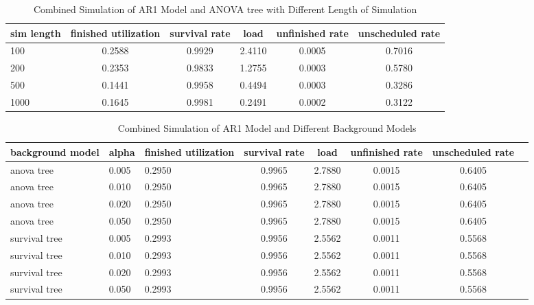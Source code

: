 \documentclass{article}
\begin{document}
\begin{longtable}[htbp]{l|*{5}{c}} 
  \caption{Combined Simulation of AR1 Model and ANOVA tree with Different Length of Simulation}
  \label{tab:tab3.2.2} \\
  \textbf{sim length} & \textbf{finished utilization} & \textbf{survival rate} &
  \textbf{load} & \textbf{unfinished rate} & \textbf{unscheduled rate} \\
  \hline
  100 & 0.2588 & 0.9929 & 2.4110 & 0.0005 & 0.7016\\
  200 & 0.2353 & 0.9833 & 1.2755 & 0.0003 & 0.5780\\
  500 & 0.1441 & 0.9958 & 0.4494 & 0.0003 & 0.3286\\
  1000 & 0.1645 & 0.9981 & 0.2491 & 0.0002 & 0.3122\\
\end{longtable}

\begin{longtable}[htbp]{l|l|l|*{5}{c}} 
  \caption{Combined Simulation of AR1 Model and Different Background Models}
  \label{tab:tab3.2.3}\\
  \textbf{background model} & \textbf{alpha} & \textbf{finished
  utilization} & \textbf{survival rate} & \textbf{load} & \textbf{unfinished
  rate} & \textbf{unscheduled rate} \\
  \hline
  anova tree & 0.005 & 0.2950 & 0.9965 & 2.7880 & 0.0015 & 0.6405\\
  anova tree & 0.010 & 0.2950 & 0.9965 & 2.7880 & 0.0015 & 0.6405\\
  anova tree & 0.020 & 0.2950 & 0.9965 & 2.7880 & 0.0015 & 0.6405\\
  anova tree & 0.050 & 0.2950 & 0.9965 & 2.7880 & 0.0015 & 0.6405\\
  survival tree & 0.005 & 0.2993 & 0.9956 & 2.5562 & 0.0011 & 0.5568\\
  survival tree & 0.010 & 0.2993 & 0.9956 & 2.5562 & 0.0011 & 0.5568\\
  survival tree & 0.020 & 0.2993 & 0.9956 & 2.5562 & 0.0011 & 0.5568\\
  survival tree & 0.050 & 0.2993 & 0.9956 & 2.5562 & 0.0011 & 0.5568\\
\end{longtable}
\end{document}
